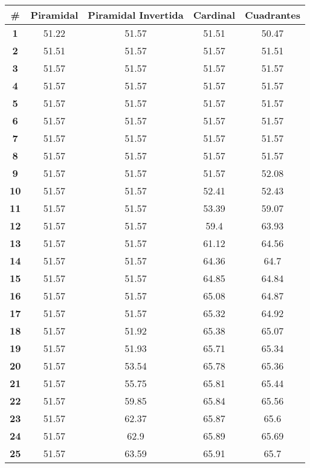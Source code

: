 \begin{longtable}{|c|c|c|c|c|}
    \hline
    \rowcolor[HTML]{ECF4FF} 
    \textbf{\#} & \textbf{Piramidal} & \textbf{Piramidal Invertida} & \textbf{Cardinal} & \textbf{Cuadrantes} \\ \hline
    \endhead
    \textbf{1} & 51.22 & 51.57 & 51.51 & 50.47 \\ \hline 
\textbf{2} & 51.51 & 51.57 & 51.57 & 51.51 \\ \hline 
\textbf{3} & 51.57 & 51.57 & 51.57 & 51.57 \\ \hline 
\textbf{4} & 51.57 & 51.57 & 51.57 & 51.57 \\ \hline 
\textbf{5} & 51.57 & 51.57 & 51.57 & 51.57 \\ \hline 
\textbf{6} & 51.57 & 51.57 & 51.57 & 51.57 \\ \hline 
\textbf{7} & 51.57 & 51.57 & 51.57 & 51.57 \\ \hline 
\textbf{8} & 51.57 & 51.57 & 51.57 & 51.57 \\ \hline 
\textbf{9} & 51.57 & 51.57 & 51.57 & 52.08 \\ \hline 
\textbf{10} & 51.57 & 51.57 & 52.41 & 52.43 \\ \hline 
\textbf{11} & 51.57 & 51.57 & 53.39 & 59.07 \\ \hline 
\textbf{12} & 51.57 & 51.57 & 59.4 & 63.93 \\ \hline 
\textbf{13} & 51.57 & 51.57 & 61.12 & 64.56 \\ \hline 
\textbf{14} & 51.57 & 51.57 & 64.36 & 64.7 \\ \hline 
\textbf{15} & 51.57 & 51.57 & 64.85 & 64.84 \\ \hline 
\textbf{16} & 51.57 & 51.57 & 65.08 & 64.87 \\ \hline 
\textbf{17} & 51.57 & 51.57 & 65.32 & 64.92 \\ \hline 
\textbf{18} & 51.57 & 51.92 & 65.38 & 65.07 \\ \hline 
\textbf{19} & 51.57 & 51.93 & 65.71 & 65.34 \\ \hline 
\textbf{20} & 51.57 & 53.54 & 65.78 & 65.36 \\ \hline 
\textbf{21} & 51.57 & 55.75 & 65.81 & 65.44 \\ \hline 
\textbf{22} & 51.57 & 59.85 & 65.84 & 65.56 \\ \hline 
\textbf{23} & 51.57 & 62.37 & 65.87 & 65.6 \\ \hline 
\textbf{24} & 51.57 & 62.9 & 65.89 & 65.69 \\ \hline 
\textbf{25} & 51.57 & 63.59 & 65.91 & 65.7 \\ \hline 

\end{longtable}
